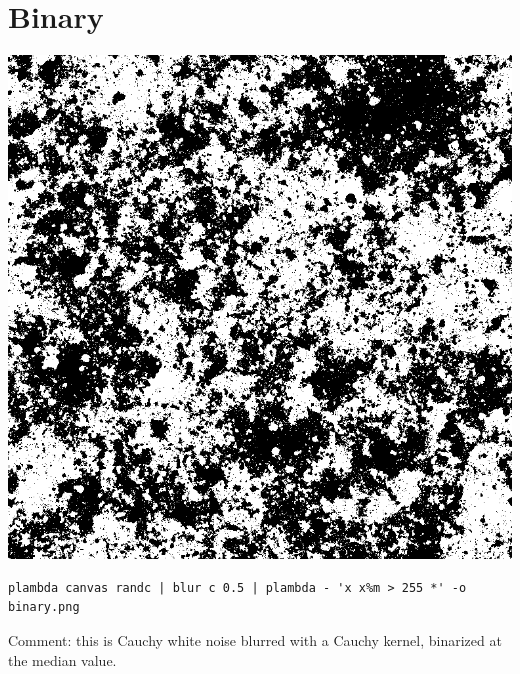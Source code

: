 \section{Binary}
\includegraphics{binary.png}
\begin{verbatim}
plambda canvas randc | blur c 0.5 | plambda - 'x x%m > 255 *' -o binary.png
\end{verbatim}
Comment: this is Cauchy white noise blurred with a Cauchy kernel, binarized
at the median value.

